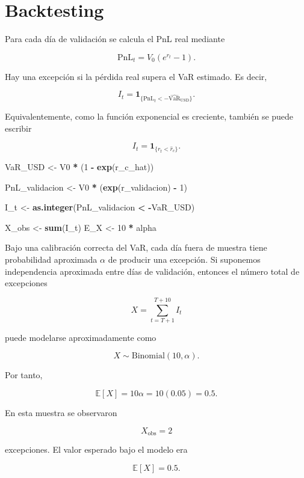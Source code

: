 \documentclass[
]{article}
\newenvironment{Shaded}{\begin{snugshade}}{\end{snugshade}}
\newcommand{\DecValTok}[1]{\textcolor[rgb]{0.00,0.00,0.81}{#1}}
\newcommand{\FunctionTok}[1]{\textcolor[rgb]{0.13,0.29,0.53}{\textbf{#1}}}
\newcommand{\NormalTok}[1]{#1}
\newcommand{\OtherTok}[1]{\textcolor[rgb]{0.56,0.35,0.01}{#1}}
\newcommand{\SpecialCharTok}[1]{\textcolor[rgb]{0.81,0.36,0.00}{\textbf{#1}}}
\begin{document}
\section{Backtesting}\label{backtesting}

Para cada día de validación se calcula el PnL real mediante

\[
\text{PnL}_t
=
V_0(e^{r_t}-1).
\]

Hay una excepción si la pérdida real supera el VaR estimado. Es decir,

\[
I_t
=
\mathbf 1_{\{\text{PnL}_t < -\widehat{\text{VaR}}_{\text{USD}}\}}.
\]

Equivalentemente, como la función exponencial es creciente, también se
puede escribir

\[
I_t
=
\mathbf 1_{\{r_t < \widehat r_c\}}.
\]

\begin{Shaded}
\begin{Highlighting}[]
\NormalTok{VaR\_USD }\OtherTok{\textless{}{-}}\NormalTok{ V0 }\SpecialCharTok{*}\NormalTok{ (}\DecValTok{1} \SpecialCharTok{{-}} \FunctionTok{exp}\NormalTok{(r\_c\_hat))}

\NormalTok{PnL\_validacion }\OtherTok{\textless{}{-}}\NormalTok{ V0 }\SpecialCharTok{*}\NormalTok{ (}\FunctionTok{exp}\NormalTok{(r\_validacion) }\SpecialCharTok{{-}} \DecValTok{1}\NormalTok{)}

\NormalTok{I\_t }\OtherTok{\textless{}{-}} \FunctionTok{as.integer}\NormalTok{(PnL\_validacion }\SpecialCharTok{\textless{}} \SpecialCharTok{{-}}\NormalTok{VaR\_USD)}

\NormalTok{X\_obs }\OtherTok{\textless{}{-}} \FunctionTok{sum}\NormalTok{(I\_t)}
\NormalTok{E\_X }\OtherTok{\textless{}{-}} \DecValTok{10} \SpecialCharTok{*}\NormalTok{ alpha}
\end{Highlighting}
\end{Shaded}

Bajo una calibración correcta del VaR, cada día fuera de muestra tiene
probabilidad aproximada \(\alpha\) de producir una excepción. Si
suponemos independencia aproximada entre días de validación, entonces el
número total de excepciones

\[
X = \sum_{t=T+1}^{T+10} I_t
\]

puede modelarse aproximadamente como

\[
X \sim \text{Binomial}(10,\alpha).
\]

Por tanto,

\[
\mathbb E[X]
=
10\alpha
=
10(0.05)
=
0.5.
\]

En esta muestra se observaron

\[
X_{\text{obs}} =
2
\]

excepciones. El valor esperado bajo el modelo era

\[
\mathbb E[X] =
0.5.
\]
\end{document}

